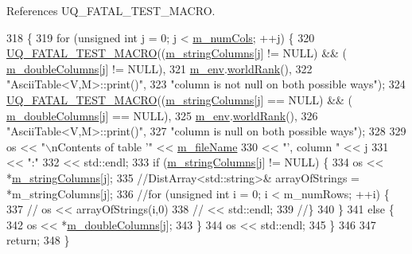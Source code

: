 References U\-Q\-\_\-\-F\-A\-T\-A\-L\-\_\-\-T\-E\-S\-T\-\_\-\-M\-A\-C\-R\-O.


\begin{DoxyCode}
318 \{
319   \textcolor{keywordflow}{for} (\textcolor{keywordtype}{unsigned} \textcolor{keywordtype}{int} j = 0; j < \hyperlink{class_q_u_e_s_o_1_1_ascii_table_ada886c8db06d2d618f2898ad2cf2bd87}{m\_numCols}; ++j) \{
320     \hyperlink{_defines_8h_a56d63d18d0a6d45757de47fcc06f574d}{UQ\_FATAL\_TEST\_MACRO}((\hyperlink{class_q_u_e_s_o_1_1_ascii_table_a14ba55d29e9a4ddeb14cd5acd8a27268}{m\_stringColumns}[j] != NULL) && (
      \hyperlink{class_q_u_e_s_o_1_1_ascii_table_aa25a1d14c88cd5de341c43e052622f51}{m\_doubleColumns}[j] != NULL),
321                         \hyperlink{class_q_u_e_s_o_1_1_ascii_table_a2ba907db652aa02d53d493980d7a3753}{m\_env}.\hyperlink{class_q_u_e_s_o_1_1_base_environment_a78b57112bbd0e6dd0e8afec00b40ffa7}{worldRank}(),
322                         \textcolor{stringliteral}{"AsciiTable<V,M>::print()"},
323                         \textcolor{stringliteral}{"column is not null on both possible ways"});
324     \hyperlink{_defines_8h_a56d63d18d0a6d45757de47fcc06f574d}{UQ\_FATAL\_TEST\_MACRO}((\hyperlink{class_q_u_e_s_o_1_1_ascii_table_a14ba55d29e9a4ddeb14cd5acd8a27268}{m\_stringColumns}[j] == NULL) && (
      \hyperlink{class_q_u_e_s_o_1_1_ascii_table_aa25a1d14c88cd5de341c43e052622f51}{m\_doubleColumns}[j] == NULL),
325                         \hyperlink{class_q_u_e_s_o_1_1_ascii_table_a2ba907db652aa02d53d493980d7a3753}{m\_env}.\hyperlink{class_q_u_e_s_o_1_1_base_environment_a78b57112bbd0e6dd0e8afec00b40ffa7}{worldRank}(),
326                         \textcolor{stringliteral}{"AsciiTable<V,M>::print()"},
327                         \textcolor{stringliteral}{"column is null on both possible ways"});
328 
329     os << \textcolor{stringliteral}{"\(\backslash\)nContents of table '"} << \hyperlink{class_q_u_e_s_o_1_1_ascii_table_adb7e4bac907ef1c93d745f02ea9f15d2}{m\_fileName}
330        << \textcolor{stringliteral}{"', column "}            << j
331        << \textcolor{stringliteral}{":"}
332        << std::endl;
333     \textcolor{keywordflow}{if} (\hyperlink{class_q_u_e_s_o_1_1_ascii_table_a14ba55d29e9a4ddeb14cd5acd8a27268}{m\_stringColumns}[j] != NULL) \{
334       os << *\hyperlink{class_q_u_e_s_o_1_1_ascii_table_a14ba55d29e9a4ddeb14cd5acd8a27268}{m\_stringColumns}[j];
335       \textcolor{comment}{//DistArray<std::string>& arrayOfStrings = *m\_stringColumns[j];}
336       \textcolor{comment}{//for (unsigned int i = 0; i < m\_numRows; ++i) \{}
337       \textcolor{comment}{//  os << arrayOfStrings(i,0)}
338       \textcolor{comment}{//     << std::endl;}
339       \textcolor{comment}{//\}}
340     \}
341     \textcolor{keywordflow}{else} \{
342       os << *\hyperlink{class_q_u_e_s_o_1_1_ascii_table_aa25a1d14c88cd5de341c43e052622f51}{m\_doubleColumns}[j];
343     \}
344     os << std::endl;
345   \}
346 
347   \textcolor{keywordflow}{return};
348 \}
\end{DoxyCode}
